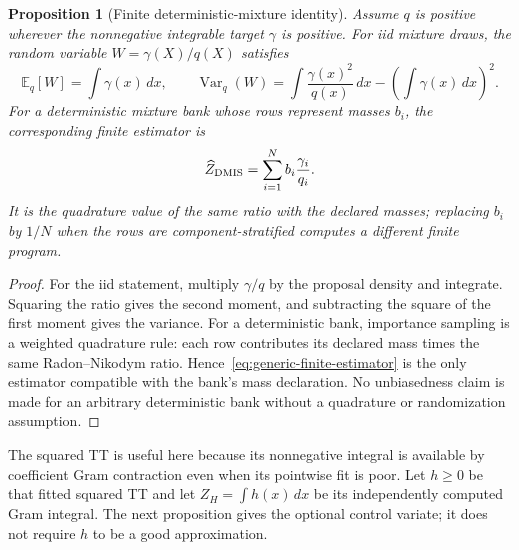 \documentclass[11pt]{article}
\newtheorem{proposition}{Proposition}
\begin{document}
\begin{proposition}[Finite deterministic-mixture identity]
\label{prop:generic-finite-dmis}
Assume $q$ is positive wherever the nonnegative integrable target $\gamma$ is
positive. For iid mixture draws, the random variable
$W=\gamma(X)/q(X)$ satisfies
\begin{equation}\label{eq:generic-dmis-expectation}
  \mathbb E_q[W]=\int\gamma(x)\,dx,
  \qquad
  \operatorname{Var}_q(W)=\int\frac{\gamma(x)^2}{q(x)}\,dx
       -\left(\int\gamma(x)\,dx\right)^2.
\end{equation}
For a deterministic mixture bank whose rows represent masses $b_i$, the
corresponding finite estimator is
\begin{equation}\label{eq:generic-finite-estimator}
  \widehat Z_{\rm DMIS}=\sum_{i=1}^N b_i\frac{\gamma_i}{q_i}.
\end{equation}
It is the quadrature value of the same ratio with the declared masses; replacing
$b_i$ by $1/N$ when the rows are component-stratified computes a different
finite program.
\end{proposition}

\begin{proof}
For the iid statement, multiply $\gamma/q$ by the proposal density and
integrate. Squaring the ratio gives the second moment, and subtracting the
square of the first moment gives the variance. For a deterministic bank,
importance sampling is a weighted quadrature rule: each row contributes its
declared mass times the same Radon--Nikodym ratio. Hence~\eqref{eq:generic-finite-estimator}
is the only estimator compatible with the bank's mass declaration. No
unbiasedness claim is made for an arbitrary deterministic bank without a
quadrature or randomization assumption.
\end{proof}

The squared TT is useful here because its nonnegative integral is available by
coefficient Gram contraction even when its pointwise fit is poor. Let $h\geq0$
be that fitted squared TT and let $Z_H=\int h(x)\,dx$ be its independently
computed Gram integral. The next proposition gives the optional control
variate; it does not require $h$ to be a good approximation.
\end{document}
